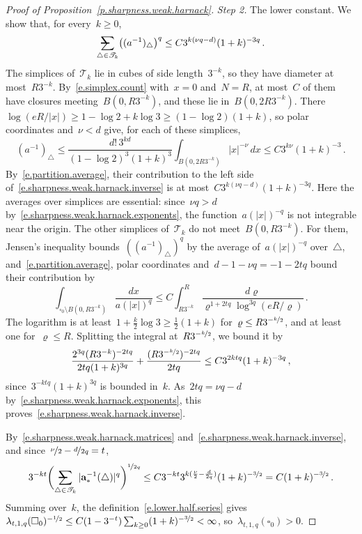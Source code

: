 \documentclass[11pt,letterpaper]{article}
\makeatletter
\numberwithin{equation}{section}
\theoremstyle{definition}
\renewcommand{\a}{\mathbf{a}}
\newcommand{\nf}{\nicefrac}
\newcommand{\cu}{\square}
\newcommand{\avsum}{\mathop{\mathpalette\avsuminner\relax}\displaylimits}
\newcommand\avsuminner[2]{%
	{\sbox0{$\m@th#1\sum$}%
		\vphantom{\usebox0}%
		\ooalign{%
			\hidewidth
			\smash{\,\rule[.23em]{8.8pt}{1.1pt} \relax}%
			\hidewidth\cr
			$\m@th#1\sum$\cr
		}%
	}%
}
\makeatother
\begin{document}
\begin{proof}[Proof of Proposition~\ref{p.sharpness.weak.harnack}]
\smallskip
\emph{Step 2.} The lower constant. We show that, for every~$k\geq0$,
\begin{equation}
	\avsum_{\triangle\in\mathscr T_k}\bigl((a^{-1})_\triangle\bigr)^q\leq C3^{k(\nu q-d)}(1+k)^{-3q}\,.
	\label{e.sharpness.weak.harnack.inverse}
\end{equation}
The simplices of~$\mathscr T_k$ lie in cubes of side length~$3^{-k}$, so they have diameter at most~$R3^{-k}$. By~\eqref{e.simplex.count} with~$x=0$ and~$N=R$, at most~$C$ of them have closures meeting~$B(0,R3^{-k})$, and these lie in~$B(0,2R3^{-k})$. There~$\log(eR/|x|)\geq1-\log2+k\log3\geq(1-\log2)(1+k)$, so polar coordinates and~$\nu<d$ give, for each of these simplices,
\begin{equation*}
	(a^{-1})_\triangle\leq\frac{d!\,3^{kd}}{(1-\log2)^3(1+k)^3}\int_{B(0,2R3^{-k})}|x|^{-\nu}\,dx\leq C3^{k\nu}(1+k)^{-3}\,.
\end{equation*}
By~\eqref{e.partition.average}, their contribution to the left side of~\eqref{e.sharpness.weak.harnack.inverse} is at most~$C3^{k(\nu q-d)}(1+k)^{-3q}$. Here the averages over simplices are essential: since~$\nu q>d$ by~\eqref{e.sharpness.weak.harnack.exponents}, the function~$a(|x|)^{-q}$ is not integrable near the origin. The other simplices of~$\mathscr T_k$ do not meet~$B(0,R3^{-k})$. For them, Jensen's inequality bounds~$((a^{-1})_\triangle)^q$ by the average of~$a(|x|)^{-q}$ over~$\triangle$, and~\eqref{e.partition.average}, polar coordinates and~$d-1-\nu q=-1-2tq$ bound their contribution by
\begin{equation*}
	\int_{\cu_0\setminus B(0,R3^{-k})}\frac{dx}{a(|x|)^q}\leq C\int_{R3^{-k}}^R\frac{d\varrho}{\varrho^{1+2tq}\log^{3q}(eR/\varrho)}\,.
\end{equation*}
The logarithm is at least~$1+\frac k2\log3\geq\frac12(1+k)$ for~$\varrho\leq R3^{-\nf k2}$, and at least one for~$\varrho\leq R$. Splitting the integral at~$R3^{-\nf k2}$, we bound it by
\begin{equation*}
	\frac{2^{3q}(R3^{-k})^{-2tq}}{2tq(1+k)^{3q}}+\frac{(R3^{-\nf k2})^{-2tq}}{2tq}\leq C3^{2ktq}(1+k)^{-3q}\,,
\end{equation*}
since~$3^{-ktq}(1+k)^{3q}$ is bounded in~$k$. As~$2tq=\nu q-d$ by~\eqref{e.sharpness.weak.harnack.exponents}, this proves~\eqref{e.sharpness.weak.harnack.inverse}.

\smallskip
By~\eqref{e.sharpness.weak.harnack.matrices} and~\eqref{e.sharpness.weak.harnack.inverse}, and since~$\nf\nu2-\nf d{2q}=t$,
\begin{equation*}
	3^{-kt}\biggl(\avsum_{\triangle\in\mathscr T_k}|\a_*^{-1}(\triangle)|^q\biggr)^{\nf1{2q}}\leq C3^{-kt}3^{k(\frac\nu2-\frac d{2q})}(1+k)^{-\nf32}=C(1+k)^{-\nf32}\,.
\end{equation*}
Summing over~$k$, the definition~\eqref{e.lower.half.series} gives~$\lambda_{t,1,q}(\cu_0)^{-\nf12}\leq C(1-3^{-t})\sum_{k\geq0}(1+k)^{-\nf32}<\infty$, so~$\lambda_{t,1,q}(\cu_0)>0$.


\end{proof}
\end{document}
